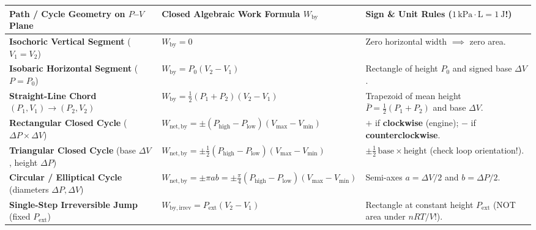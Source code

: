 \begin{formulacard}
\par\smallskip\noindent
\footnotesize\setlength{\tabcolsep}{4pt}\renewcommand{\arraystretch}{1.15}
\begin{tabularx}{\linewidth}{@{}l l X@{}}
\toprule
\textbf{Path / Cycle Geometry on $P$--$V$ Plane} & \textbf{Closed Algebraic Work Formula $W_{\mathrm{by}}$} & \textbf{Sign \& Unit Rules ($1\,\si{\kilo\pascal}\cdot\si{\liter} = \SI{1}{\joule}$!)} \\
\midrule
\textbf{Isochoric Vertical Segment} ($V_1 = V_2$) & $W_{\mathrm{by}} = 0$ & Zero horizontal width $\implies$ zero area. \\
\textbf{Isobaric Horizontal Segment} ($P = P_0$) & $W_{\mathrm{by}} = P_0(V_2 - V_1)$ & Rectangle of height $P_0$ and signed base $\Delta V$. \\
\textbf{Straight-Line Chord} $(P_1,V_1)\to(P_2,V_2)$ & $W_{\mathrm{by}} = \frac{1}{2}(P_1 + P_2)(V_2 - V_1)$ & Trapezoid of mean height $\bar{P}=\frac{1}{2}(P_1+P_2)$ and base $\Delta V$. \\
\textbf{Rectangular Closed Cycle} ($\Delta P \times \Delta V$) & $W_{\mathrm{net,by}} = \pm(P_{\mathrm{high}} - P_{\mathrm{low}})(V_{\max} - V_{\min})$ & $+$ if \textbf{clockwise} (engine); $-$ if \textbf{counterclockwise}. \\
\textbf{Triangular Closed Cycle} (base $\Delta V$, height $\Delta P$) & $W_{\mathrm{net,by}} = \pm\frac{1}{2}(P_{\mathrm{high}} - P_{\mathrm{low}})(V_{\max} - V_{\min})$ & $\pm\frac{1}{2}\,\text{base}\times\text{height}$ (check loop orientation!). \\
\textbf{Circular / Elliptical Cycle} (diameters $\Delta P, \Delta V$) & $W_{\mathrm{net,by}} = \pm\pi a b = \pm\frac{\pi}{4}(P_{\mathrm{high}} - P_{\mathrm{low}})(V_{\max} - V_{\min})$ & Semi-axes $a = \Delta V/2$ and $b = \Delta P/2$. \\
\textbf{Single-Step Irreversible Jump} (fixed $P_{\mathrm{ext}}$) & $W_{\mathrm{by,irrev}} = P_{\mathrm{ext}}(V_2 - V_1)$ & Rectangle at constant height $P_{\mathrm{ext}}$ (NOT area under $nRT/V$!). \\
\bottomrule
\end{tabularx}
\end{formulacard}

